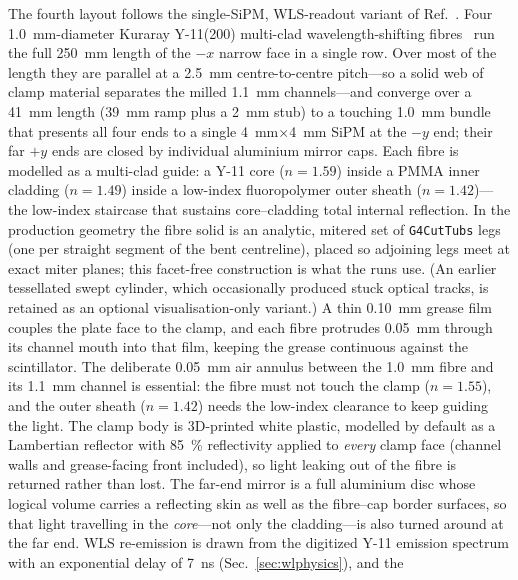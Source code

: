 \documentclass[11pt,a4paper]{article}
\begin{document}
The fourth layout follows the single-SiPM, WLS-readout variant of
Ref.~\cite{Rao2025}. Four \SI{1.0}{\milli\meter}-diameter Kuraray Y-11(200)
multi-clad wavelength-shifting fibres~\cite{KurarayPSF,Alekseev2022} run the full
\SI{250}{\milli\meter} length of the $-x$ narrow face in a single row. Over most
of the length they are parallel at a \SI{2.5}{\milli\meter} centre-to-centre
pitch---so a solid web of clamp material separates the milled
\SI{1.1}{\milli\meter} channels---and converge over a \SI{41}{\milli\meter}
length (\SI{39}{\milli\meter} ramp plus a \SI{2}{\milli\meter} stub) to a
touching \SI{1.0}{\milli\meter} bundle that presents
all four ends to a single \SI{4}{\milli\meter}$\times$\SI{4}{\milli\meter} SiPM at
the $-y$ end; their far $+y$ ends are closed by individual aluminium mirror caps.
Each fibre is modelled as a multi-clad guide: a Y-11 core ($n = 1.59$) inside a
PMMA inner cladding ($n = 1.49$) inside a low-index fluoropolymer outer sheath
($n = 1.42$)---the low-index staircase that sustains core--cladding total
internal reflection. In the production geometry the fibre solid is an analytic,
mitered set of \texttt{G4CutTubs} legs (one per straight segment of the bent
centreline), placed so adjoining legs meet at exact miter planes; this
facet-free construction is what the runs use. (An earlier tessellated swept
cylinder, which occasionally produced stuck optical tracks, is retained as an
optional visualisation-only variant.) A thin \SI{0.10}{\milli\meter} grease film
couples the plate face to the clamp, and each fibre protrudes
\SI{0.05}{\milli\meter} through its channel mouth into that film, keeping the
grease continuous against the scintillator. The deliberate
\SI{0.05}{\milli\meter} air annulus between the \SI{1.0}{\milli\meter} fibre and
its \SI{1.1}{\milli\meter} channel is essential: the fibre must not touch the
clamp ($n = 1.55$), and the outer sheath ($n = 1.42$) needs the low-index
clearance to keep guiding the light. The clamp body is 3D-printed white plastic,
modelled by default as a Lambertian reflector with \SI{85}{\percent} reflectivity
applied to \emph{every} clamp face (channel walls and grease-facing front
included), so light leaking out of the fibre is returned rather than lost. The
far-end mirror is a full aluminium disc whose logical volume carries a reflecting
skin as well as the fibre--cap border surfaces, so that light travelling in the
\emph{core}---not only the cladding---is also turned around at the far end. WLS
re-emission is drawn from the digitized Y-11 emission spectrum with an
exponential delay of \SI{7}{\nano\second} (Sec.~\ref{sec:wlphysics}), and the
\end{document}
